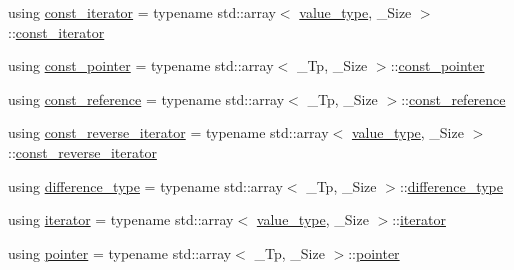 \begin{DoxyCompactItemize}
\item 
using \hyperlink{class____gnu__cxx_1_1__StaticPolynomial_a2e806a3a61788a2fad49adf67725ae7e}{const\+\_\+iterator} = typename std\+::array$<$ \hyperlink{class____gnu__cxx_1_1__StaticPolynomial_aad5f3d6d5876b6926b30724aeac649d6}{value\+\_\+type}, \+\_\+\+Size $>$\+::\hyperlink{class____gnu__cxx_1_1__StaticPolynomial_a2e806a3a61788a2fad49adf67725ae7e}{const\+\_\+iterator}
\item 
using \hyperlink{class____gnu__cxx_1_1__StaticPolynomial_aca8a01882c3f641029a27d77ff1afc5d}{const\+\_\+pointer} = typename std\+::array$<$ \+\_\+\+Tp, \+\_\+\+Size $>$\+::\hyperlink{class____gnu__cxx_1_1__StaticPolynomial_aca8a01882c3f641029a27d77ff1afc5d}{const\+\_\+pointer}
\item 
using \hyperlink{class____gnu__cxx_1_1__StaticPolynomial_a5beadf45736ad37f2cb46e06050d9ee9}{const\+\_\+reference} = typename std\+::array$<$ \+\_\+\+Tp, \+\_\+\+Size $>$\+::\hyperlink{class____gnu__cxx_1_1__StaticPolynomial_a5beadf45736ad37f2cb46e06050d9ee9}{const\+\_\+reference}
\item 
using \hyperlink{class____gnu__cxx_1_1__StaticPolynomial_ae59b7bc5bdf7c61e562e8c4c8eaf904d}{const\+\_\+reverse\+\_\+iterator} = typename std\+::array$<$ \hyperlink{class____gnu__cxx_1_1__StaticPolynomial_aad5f3d6d5876b6926b30724aeac649d6}{value\+\_\+type}, \+\_\+\+Size $>$\+::\hyperlink{class____gnu__cxx_1_1__StaticPolynomial_ae59b7bc5bdf7c61e562e8c4c8eaf904d}{const\+\_\+reverse\+\_\+iterator}
\item 
using \hyperlink{class____gnu__cxx_1_1__StaticPolynomial_a5a19bcdbc252f457c64ac035d33e824a}{difference\+\_\+type} = typename std\+::array$<$ \+\_\+\+Tp, \+\_\+\+Size $>$\+::\hyperlink{class____gnu__cxx_1_1__StaticPolynomial_a5a19bcdbc252f457c64ac035d33e824a}{difference\+\_\+type}
\item 
using \hyperlink{class____gnu__cxx_1_1__StaticPolynomial_af042e6cdb307879fbfe357c13a843c7c}{iterator} = typename std\+::array$<$ \hyperlink{class____gnu__cxx_1_1__StaticPolynomial_aad5f3d6d5876b6926b30724aeac649d6}{value\+\_\+type}, \+\_\+\+Size $>$\+::\hyperlink{class____gnu__cxx_1_1__StaticPolynomial_af042e6cdb307879fbfe357c13a843c7c}{iterator}
\item 
using \hyperlink{class____gnu__cxx_1_1__StaticPolynomial_a7d03f6214af023bf7b7587c36436f4ec}{pointer} = typename std\+::array$<$ \+\_\+\+Tp, \+\_\+\+Size $>$\+::\hyperlink{class____gnu__cxx_1_1__StaticPolynomial_a7d03f6214af023bf7b7587c36436f4ec}{pointer}

\end{DoxyCompactItemize}
